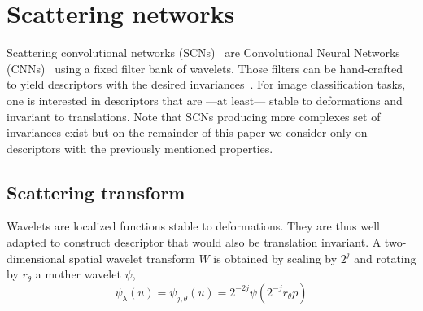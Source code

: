 \documentclass{article}
\begin{document}
  

\section{Scattering networks}
  \label{sec:SCN}


    Scattering convolutional networks (SCNs)~\cite{bruna2013invariant} are Convolutional Neural Networks (CNNs)~\cite{lecun1995convolutional} using a fixed filter bank of wavelets. Those filters can be hand-crafted to yield descriptors with the desired invariances~\cite{mallat2012gis}. For image classification tasks, one is interested in descriptors that are ---at least--- stable to deformations and invariant to translations. Note that SCNs producing more complexes set of invariances exist but on the remainder of this paper we consider only on descriptors with the previously mentioned properties.

  
  \subsection{Scattering transform}
    \label{subsec:SCN/ST}
    
    Wavelets are localized functions stable to deformations. They are thus well adapted to construct descriptor that would also be translation invariant. A two-dimensional spatial wavelet transform $W$ is obtained by scaling by $2^{j}$ and rotating by $r_{\theta}$ a mother wavelet $\psi$,
    \vspace{-5pt}
    \begin{equation}
      \label{eq:multi-scale directional wavelet}
      \psi_{\lambda}(u) = \psi_{j,\theta}(u) = 2^{-2j} \psi(2^{-j}r_{\theta}p)
    \end{equation}
    
\end{document}
